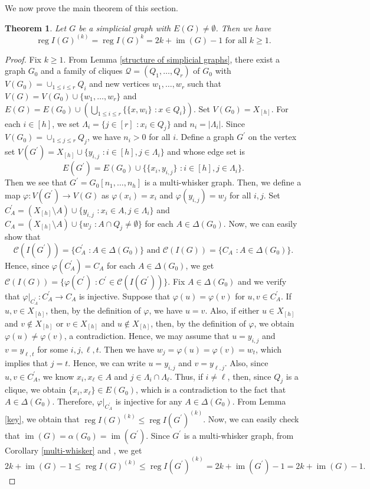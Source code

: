 \documentclass[12pt]{amsart}
\newtheorem{thm}{Theorem}[section]
\theoremstyle{definition}
\theoremstyle{remark}
\DeclareMathOperator{\reg}{reg}
\DeclareMathOperator{\im}{im}
\begin{document}
We now prove the main theorem of this section. 

\begin{thm}\label{main1}
Let $G$ be a simplicial graph with $E(G)\neq\emptyset$. Then we have 
$$\reg I(G)^{(k)}=\reg I(G)^{k}=2k+\im(G)-1\mbox{ for all }k\geq1.$$
\end{thm}
\begin{proof}
Fix $k\geq1$. From Lemma \ref{structure of simplicial graphs},  there exist a graph $G_{0}$ and a family of cliques $\mathcal{Q}=(Q_{1},\ldots, Q_{r})$ of $G_{0}$ with $V(G_{0})=\cup_{1\leq i\leq r}Q_{i}$ and new vertices $w_{1},\ldots, w_{r}$ such that $V(G)=V(G_{0})\cup\{w_{1},\ldots, w_{r}\}$ and $E(G)=E(G_{0})\cup(\bigcup_{1\leq i\leq r}\{\{x,w_{i}\}\,\,: x\in Q_{i}\})$. Set $V(G_{0})=X_{[h]}$. For each $i\in[h]$, we set $\Lambda_{i}=\{j\in[r]\,\,: x_{i}\in Q_{j}\}$ and $n_{i}=|\Lambda_{i}|$. Since $V(G_{0})=\cup_{1\leq j\leq r}Q_{j}$, we have $n_{i}>0$ for all $i$. Define a graph $G^{\prime}$ on the vertex set $V(G^{\prime})=X_{[h]}\cup\{y_{i,j}\,\,: i\in[h], j\in\Lambda_{i}\}$ and whose edge set is 
$$E(G^{\prime})=E(G_{0})\cup\{\{x_{i},y_{i,j}\}\,\,: i\in[h], j\in\Lambda_{i}\}.$$
Then we see that $G^{\prime}=G_{0}[n_{1},\ldots, n_{h}]$ is a multi-whisker graph. Then, we define a map $\varphi:V(G^{\prime})\rightarrow V(G)$ as $\varphi(x_{i})=x_{i}$ and $\varphi(y_{i,j})=w_{j}$ for all $i,j$. Set $C^{\prime}_{A}=(X_{[h]}\setminus A)\cup\{y_{i,j}\,\,: x_{i}\in A, j\in\Lambda_{i}\}$ and $C_{A}=(X_{[h]}\setminus A)\cup\{w_{j}\,\,: A\cap Q_{j}\neq\emptyset\}$ for each $A\in\Delta(G_{0})$. Now, we can easily show that $$\mathcal{C}(I(G^{\prime}))=\{C^{\prime}_{A}\,\,: A\in\Delta(G_{0})\}\mbox{ and }\mathcal{C}(I(G))=\{C_{A}\,\,: A\in\Delta(G_{0})\}.$$
Hence, since $\varphi(C^{\prime}_{A})=C_{A}$ for each $A\in\Delta(G_{0})$, we get $\mathcal{C}(I(G))=\{\varphi(C^{\prime})\,\,: C^{\prime}\in\mathcal{C}(I(G^{\prime}))\}$. Fix $A\in\Delta(G_{0})$ and we verify that $\varphi|_{C^{\prime}_{A}}: C^{\prime}_{A}\rightarrow C_{A}$ is injective. Suppose that $\varphi(u)=\varphi(v)$ for $u,v\in C^{\prime}_{A}$. If $u, v\in X_{[h]}$, then, by the definition of $\varphi$, we have $u=v$. Also, if either $u\in X_{[h]}$ and $v\notin X_{[h]}$ or $v\in X_{[h]}$ and $u\notin X_{[h]}$, then,  by the definition of $\varphi$, we obtain $\varphi(u)\neq\varphi(v)$, a contradiction. Hence, we may assume that $u=y_{i,j}$ and $v=y_{\ell,t}$ for some $i,j,\ell,t$. Then we have $w_{j}=\varphi(u)=\varphi(v)=w_{t}$, which implies that $j=t$. Hence, we can write $u=y_{i,j}$ and $v=y_{\ell,j}$. Also, since $u,v\in C_{A}^{\prime}$, we know $x_{i},x_{\ell}\in A$ and $j\in\Lambda_{i}\cap\Lambda_{\ell}$. Thus, if $i\neq\ell$, then, since $Q_{j}$ is a clique, we obtain $\{x_{i},x_{\ell}\}\in E(G_{0})$, which is a contradiction to the fact that $A\in\Delta(G_{0})$. Therefore, $\varphi|_{C_{A}^{\prime}}$ is injective for any $A\in\Delta(G_{0})$. From Lemma \ref{key}, we obtain that $\reg I(G)^{(k)}\leq\reg I(G^{\prime})^{(k)}$. Now, we can easily check that $\im(G)=\alpha(G_{0})=\im(G^{\prime})$. Since $G^{\prime}$ is a multi-whisker graph, from Corollary \ref{multi-whisker} and \cite[Theorem 4.6]{ghrs2020}, we get $$2k+\im(G)-1\leq\reg I(G)^{(k)}\leq\reg I(G^{\prime})^{(k)}=2k+\im(G^{\prime})-1=2k+\im(G)-1.$$

\end{proof}
\end{document}
